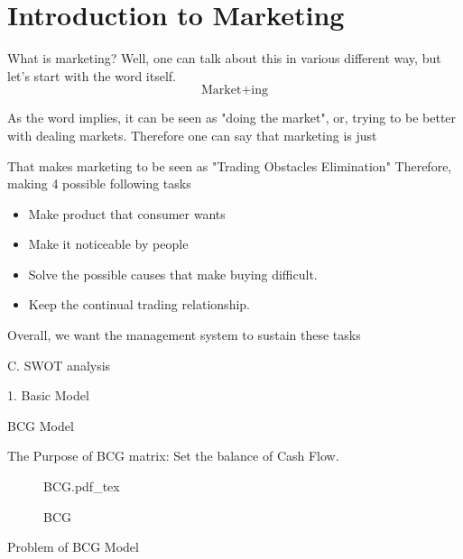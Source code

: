 \documentclass[12pt]{article}
\begin{document}
\maketitle

\section{Introduction to Marketing}

What is marketing? Well, one can talk about this in various different way, but let's start with the word itself.
$$ \text{Market}+\text{ing} $$

As the word implies, it can be seen as "doing the market", or, trying to be better with dealing markets. Therefore one can say that marketing is just

\begin{tcolorbox}
\end{tcolorbox}

That makes marketing to be seen as "Trading Obstacles Elimination" Therefore, making 4 possible following tasks
\begin{itemize}
	\item Make product that consumer wants
	\item Make it noticeable by people
	\item Solve the possible causes that make buying difficult.
	\item Keep the continual trading relationship.
\end{itemize}

Overall, we want the management system to sustain these tasks


C. SWOT analysis

1. Basic Model

BCG Model

The Purpose of BCG matrix: Set the balance of Cash Flow.
\begin{figure}[H]
	\centering
	\def\svgwidth{\columnwidth}
	{BCG.pdf_tex}
	\caption{BCG}
	\label{fig:BCG Model}
\end{figure}

Problem of BCG Model
\end{document}
